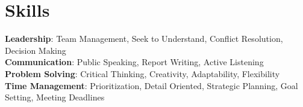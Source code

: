 \documentclass[letterpaper,11pt]{article}
\begin{document}
\section{Skills}
\begin{itemize}[leftmargin=0.15in, label={}]
	\small{\item{
    \textbf{Leadership}{: Team Management, Seek to Understand, Conflict Resolution, Decision Making} \\
    \textbf{Communication}{: Public Speaking, Report Writing, Active Listening} \\
    \textbf{Problem Solving}{: Critical Thinking, Creativity, Adaptability, Flexibility} \\
    \textbf{Time Management}{: Prioritization, Detail Oriented, Strategic Planning, Goal Setting, Meeting Deadlines} \\
    }}
\end{itemize}

\end{document}
